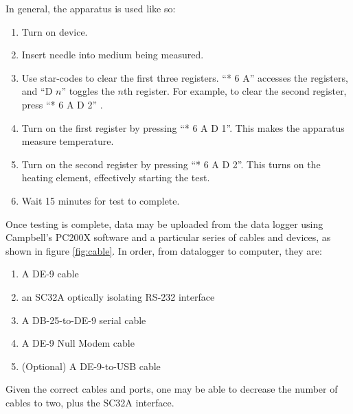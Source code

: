 
In general, the apparatus is used like so:

\begin{enumerate}
\item Turn on device.
\item Insert needle into medium being measured.
\item Use star-codes to clear the first three registers. ``* 6 A'' accesses the
registers, and ``D \(n\)'' toggles the \(n\)th register. For example, to clear
the second register, press ``* 6 A D 2'' .
\item Turn on the first register by pressing ``* 6 A D 1''. This makes the
apparatus measure temperature.
\item Turn on the second register by pressing ``* 6 A D 2''. This turns on the
heating element, effectively starting the test.
\item Wait 15 minutes for test to complete.
\end{enumerate}

Once testing is complete, data may be uploaded from the data logger using
Campbell's PC200X software and a particular series of cables and devices, as
shown in figure \ref{fig:cable}. In order, from datalogger to computer, they
are:


\begin{enumerate}
\item A DE-9 cable
\item an SC32A optically isolating RS-232 interface
\item A DB-25-to-DE-9 serial cable
\item A DE-9 Null Modem cable
\item (Optional) A DE-9-to-USB cable
\end{enumerate}

Given the correct cables and ports, one may be able to decrease the number of
cables to two, plus the SC32A interface.

